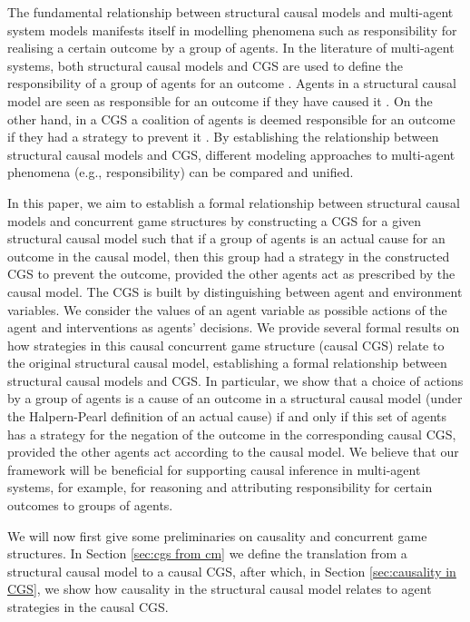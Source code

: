 The fundamental relationship between structural causal models and multi-agent system models manifests itself in modelling phenomena such as responsibility for realising a certain outcome by a group of agents.
In the literature of multi-agent systems, both structural causal models and CGS are used to define the responsibility of a group of agents for an outcome \cite{chockler2004responsibility,yazdanpanah2019strategic}. Agents in a structural causal model are seen as responsible for an outcome if they have caused it \cite{chockler2004responsibility}. On the other hand, in a CGS a coalition of agents is deemed responsible for an outcome if they had a strategy to prevent it \cite{yazdanpanah2019strategic}. 
By establishing the relationship between structural causal models and CGS, different modeling approaches to multi-agent phenomena (e.g., responsibility) can be compared and unified. 

In this paper, we aim to establish a formal relationship between structural causal models and concurrent game structures by constructing a CGS for a given structural causal model such that if a group of agents is an actual cause for an outcome in the causal model, then this group had a strategy in the constructed CGS to prevent the outcome, provided the other agents act as prescribed by the causal model.
The CGS is built by distinguishing between agent and environment variables.
We consider the values of an agent variable as possible actions of the agent and interventions as agents' decisions. 
We provide several formal results on how strategies in this causal concurrent game structure (causal CGS) relate to the original structural causal model, establishing a formal relationship between structural causal models and CGS.
In particular, we show that a choice of actions by a group of agents is a cause of an outcome in a structural causal model (under the Halpern-Pearl definition of an actual cause) if and only if this set of agents has a strategy for the negation of the outcome in the corresponding causal CGS, provided the other agents act according to the causal model.
We believe that our framework will be beneficial for supporting causal inference in multi-agent systems, for example, for reasoning and attributing responsibility for certain outcomes to groups of agents. 

We will now first give some preliminaries on causality and concurrent game structures.
In Section \ref{sec:cgs from cm} we define the translation from a structural causal model to a causal CGS, after which, in Section \ref{sec:causality in CGS}, we show how causality in the structural causal model relates to agent strategies in the causal CGS.


